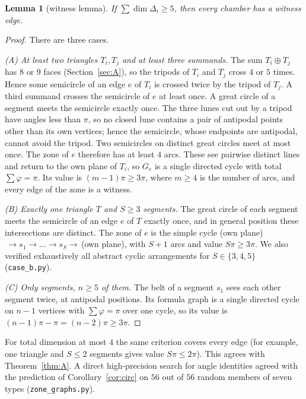 \documentclass[11pt]{amsart}
\newtheorem{lemma}[thm]{Lemma}
\theoremstyle{definition}
\newcommand{\msum}{\oplus}
\begin{document}
\begin{lemma}[witness lemma]\label{lem:witness}
If $\sum\dim\Delta_i\ge5$, then every chamber has a witness edge.
\end{lemma}
\begin{proof}
There are three cases.

\emph{(A) At least two triangles $T_i,T_j$ and at least three summands.} The sum $T_i\msum T_j$ has $8$ or $9$
faces (Section~\ref{sec:A}), so the tripods of $T_i$ and $T_j$ cross $4$ or $5$ times. Hence some semicircle
of an edge $e$ of $T_i$ is crossed twice by the tripod of $T_j$. A third summand crosses the semicircle of $e$ at least
once. A great circle of a segment meets the semicircle exactly once. The three lunes cut out by a tripod have angles
less than $\pi$, so no closed lune contains a pair of antipodal points other than its own vertices; hence the semicircle,
whose endpoints are antipodal, cannot avoid the tripod. Two semicircles on distinct great circles meet at most once. The zone of $e$ therefore has at least $4$
arcs. These see pairwise distinct lines and return to the own plane of $T_i$, so $G_e$ is a single directed cycle with
total $\sum\varphi=\pi$. Its value is $(m-1)\pi\ge3\pi$, where $m\ge4$ is the number of arcs, and every edge of the
zone is a witness.

\emph{(B) Exactly one triangle $T$ and $S\ge3$ segments.} The great circle of each segment meets the semicircle of
an edge $e$ of $T$ exactly once, and in general position these intersections are distinct. The zone of $e$ is
the simple cycle (own plane)$\,\to s_1\to\dots\to s_S\to\,$(own plane), with $S+1$ arcs and value $S\pi\ge3\pi$. We
also verified exhaustively all abstract cyclic arrangements for $S\in\{3,4,5\}$ (\texttt{case\_b.py}).

\emph{(C) Only segments, $n\ge5$ of them.} The belt of a segment $s_1$ sees each other segment twice, at antipodal
positions. Its formula graph is a single directed cycle on $n-1$ vertices with $\sum\varphi=\pi$ over one cycle,
so its value is $(n-1)\pi-\pi=(n-2)\pi\ge3\pi$.
\end{proof}

For total dimension at most $4$ the same criterion covers every edge (for example, one triangle and $S\le2$
segments gives value $S\pi\le2\pi$). This agrees with Theorem~\ref{thm:A}. A direct high-precision search for angle
identities agreed with the prediction of Corollary~\ref{cor:circ} on $56$ out of $56$ random members of seven types
(\texttt{zone\_graphs.py}).
\end{document}
